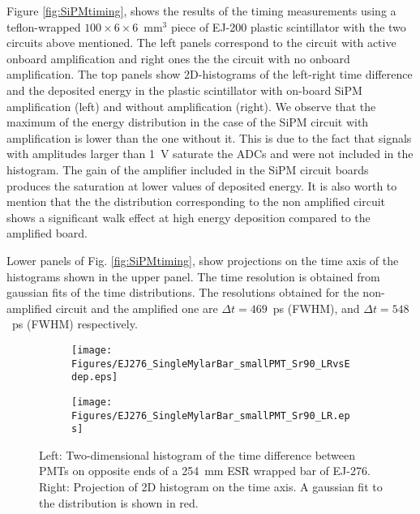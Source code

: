 Figure \ref{fig:SiPMtiming}, shows the results of the timing measurements using a  teflon-wrapped $100\times6\times6$~mm$^3$ piece of EJ-200 plastic scintillator with the two circuits above mentioned. The left panels correspond to the circuit with active onboard amplification and right ones the the circuit with no onboard amplification. The top panels show 2D-histograms of the left-right time difference and the deposited energy in the plastic scintillator with on-board SiPM amplification (left) and without amplification (right). We observe that the maximum of the energy distribution in the case of the SiPM circuit with amplification is lower than the one without it. This is due to the fact that signals with amplitudes larger than 1~V saturate the ADCs and were not included in the histogram. The gain of the amplifier included in the SiPM circuit boards produces the saturation at lower values of deposited energy. It is also worth to mention that the the distribution corresponding to the non amplified circuit shows a significant walk effect at high energy deposition compared to the amplified board.

Lower panels of Fig. \ref{fig:SiPMtiming}, show projections on the time axis of the histograms shown in the upper panel. The time resolution is obtained from  gaussian fits of the time distributions. The resolutions obtained for the non-amplified circuit and the amplified one are $\Delta t=469$~ps (FWHM), and $\Delta t=548$~ps (FWHM) respectively.

\begin{figure}[hbt]
  \centering
  \begin{subfigure}{0.5\linewidth}
    \raggedleft
    \texttt{[image: Figures/EJ276\_SingleMylarBar\_smallPMT\_Sr90\_LRvsEdep.eps]}
  \end{subfigure}%
  \begin{subfigure}{0.5\linewidth}
    \raggedright
    \texttt{[image: Figures/EJ276\_SingleMylarBar\_smallPMT\_Sr90\_LR.eps]}
  \end{subfigure}%
  \caption{Left: Two-dimensional histogram of the time difference between PMTs on opposite ends of a 254~mm ESR wrapped bar of EJ-276. Right: Projection of 2D histogram on the time axis. A gaussian fit to the distribution is shown in red.}
  \label{fig:MylarTiming}
\end{figure}
 
